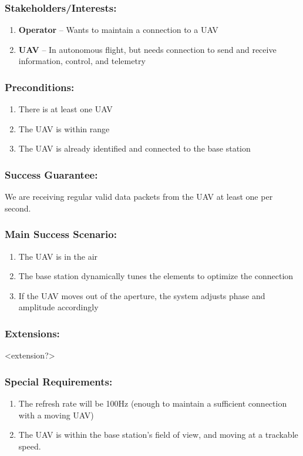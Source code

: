 \documentclass[ProductRequirements.tex]{subfiles}
\begin{document}
	\subsubsection*{Stakeholders/Interests:}
	\begin{enumerate}\itemsep1pt
		\item \textbf{Operator} -- Wants to maintain a connection to a UAV
		\item \textbf{UAV} -- In autonomous flight, but needs connection to send and receive information, control, and telemetry
	\end{enumerate}
	\subsubsection*{Preconditions:}
	\begin{enumerate}\itemsep1pt
		\item There is at least one UAV
		\item The UAV is within range
		\item The UAV is already identified and connected to the base station
	\end{enumerate}
	\subsubsection*{Success Guarantee:}
	We are receiving regular valid data packets from the UAV at least one per second. 
	\subsubsection*{Main Success Scenario:}
	\begin{enumerate}\itemsep1pt
		\item The UAV is in the air
		\item The base station dynamically tunes the elements to optimize the connection 
		\item If the UAV moves out of the aperture, the system adjusts phase and amplitude accordingly
	\end{enumerate}
	\subsubsection*{Extensions:}
	<extension?>
	\subsubsection*{Special Requirements:}
	\begin{enumerate}\itemsep1pt
		\item The refresh rate will be 100Hz (enough to maintain a sufficient connection with a moving UAV)
		\item The UAV is within the base station's field of view, and moving at a trackable speed. 
	\end{enumerate}
\end{document}
